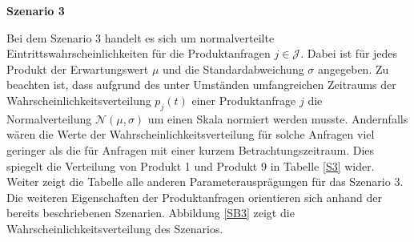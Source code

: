 \textbf{Szenario 3}

Bei dem Szenario 3 handelt es sich um normalverteilte Eintrittswahrscheinlichkeiten für die Produktanfragen $j\in\mathcal{J}$. Dabei ist für jedes Produkt der Erwartungswert $\mu$ und die Standardabweichung $\sigma$ angegeben. Zu beachten ist, dass aufgrund des unter Umständen umfangreichen Zeitraums der Wahrscheinlichkeitsverteilung $p_j(t)$ einer Produktanfrage $j$ die Normalverteilung $\mathcal{N}(\mu,\sigma)$ um einen Skala normiert werden musste. Andernfalls wären die Werte der Wahrscheinlichkeitsverteilung für solche Anfragen viel geringer als die für Anfragen mit einer kurzem Betrachtungszeitraum. Dies spiegelt die Verteilung von Produkt 1 und Produkt 9 in Tabelle \ref{S3} wider. Weiter zeigt die Tabelle alle anderen Parameterausprägungen für das Szenario 3. Die weiteren Eigenschaften der Produktanfragen orientieren sich anhand der bereits beschriebenen Szenarien. Abbildung \ref{SB3} zeigt die Wahrscheinlichkeitsverteilung des Szenarios.

